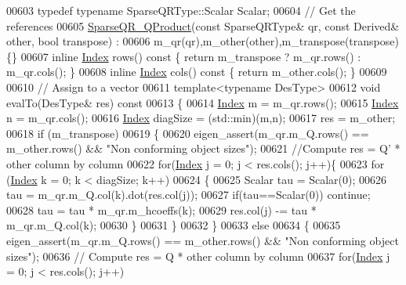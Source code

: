 \begin{DoxyCode}
00603   \textcolor{keyword}{typedef} \textcolor{keyword}{typename} SparseQRType::Scalar Scalar;
00604   \textcolor{comment}{// Get the references }
00605   \hyperlink{struct_eigen_1_1_sparse_q_r___q_product}{SparseQR\_QProduct}(\textcolor{keyword}{const} SparseQRType& qr, \textcolor{keyword}{const} Derived& other, \textcolor{keywordtype}{bool} transpose) : 
00606   m\_qr(qr),m\_other(other),m\_transpose(transpose) \{\}
00607   \textcolor{keyword}{inline} \hyperlink{namespace_eigen_a62e77e0933482dafde8fe197d9a2cfde}{Index} rows()\textcolor{keyword}{ const }\{ \textcolor{keywordflow}{return} m\_transpose ? m\_qr.rows() : m\_qr.cols(); \}
00608   \textcolor{keyword}{inline} \hyperlink{namespace_eigen_a62e77e0933482dafde8fe197d9a2cfde}{Index} cols()\textcolor{keyword}{ const }\{ \textcolor{keywordflow}{return} m\_other.cols(); \}
00609   
00610   \textcolor{comment}{// Assign to a vector}
00611   \textcolor{keyword}{template}<\textcolor{keyword}{typename} DesType>
00612   \textcolor{keywordtype}{void} evalTo(DesType& res)\textcolor{keyword}{ const}
00613 \textcolor{keyword}{  }\{
00614     \hyperlink{namespace_eigen_a62e77e0933482dafde8fe197d9a2cfde}{Index} m = m\_qr.rows();
00615     \hyperlink{namespace_eigen_a62e77e0933482dafde8fe197d9a2cfde}{Index} n = m\_qr.cols();
00616     \hyperlink{namespace_eigen_a62e77e0933482dafde8fe197d9a2cfde}{Index} diagSize = (std::min)(m,n);
00617     res = m\_other;
00618     \textcolor{keywordflow}{if} (m\_transpose)
00619     \{
00620       eigen\_assert(m\_qr.m\_Q.rows() == m\_other.rows() && \textcolor{stringliteral}{"Non conforming object sizes"});
00621       \textcolor{comment}{//Compute res = Q' * other column by column}
00622       \textcolor{keywordflow}{for}(\hyperlink{namespace_eigen_a62e77e0933482dafde8fe197d9a2cfde}{Index} j = 0; j < res.cols(); j++)\{
00623         \textcolor{keywordflow}{for} (\hyperlink{namespace_eigen_a62e77e0933482dafde8fe197d9a2cfde}{Index} k = 0; k < diagSize; k++)
00624         \{
00625           Scalar tau = Scalar(0);
00626           tau = m\_qr.m\_Q.col(k).dot(res.col(j));
00627           \textcolor{keywordflow}{if}(tau==Scalar(0)) \textcolor{keywordflow}{continue};
00628           tau = tau * m\_qr.m\_hcoeffs(k);
00629           res.col(j) -= tau * m\_qr.m\_Q.col(k);
00630         \}
00631       \}
00632     \}
00633     \textcolor{keywordflow}{else}
00634     \{
00635       eigen\_assert(m\_qr.m\_Q.rows() == m\_other.rows() && \textcolor{stringliteral}{"Non conforming object sizes"});
00636       \textcolor{comment}{// Compute res = Q * other column by column}
00637       \textcolor{keywordflow}{for}(\hyperlink{namespace_eigen_a62e77e0933482dafde8fe197d9a2cfde}{Index} j = 0; j < res.cols(); j++)

\end{DoxyCode}
